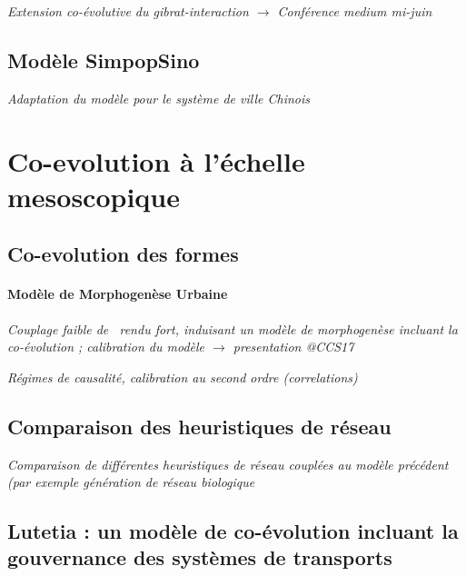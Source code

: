 \textit{Extension co-évolutive du gibrat-interaction $\rightarrow$ Conférence medium mi-juin}


\subsection{Modèle SimpopSino}

\textit{Adaptation du modèle pour le système de ville Chinois}





\section{Co-evolution à l'échelle mesoscopique}

\subsection{Co-evolution des formes}

\paragraph{Modèle de Morphogenèse Urbaine}


\textit{Couplage faible de~\cite{raimbault2016generation} rendu fort, induisant un modèle de morphogenèse incluant la co-évolution ; calibration du modèle $\rightarrow$ presentation @CCS17}

\textit{Régimes de causalité, calibration au second ordre (correlations)}

\subsection{Comparaison des heuristiques de réseau}

\textit{Comparaison de différentes heuristiques de réseau couplées au modèle précédent (par exemple génération de réseau biologique \cite{raimbault2015labex}}



\subsection{Lutetia : un modèle de co-évolution incluant la gouvernance des systèmes de transports}

